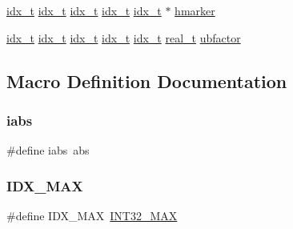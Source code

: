 \begin{DoxyCompactItemize}
\item 
\hyperlink{a00876_aaa5262be3e700770163401acb0150f52}{idx\+\_\+t} \hyperlink{a00876_aaa5262be3e700770163401acb0150f52}{idx\+\_\+t} \hyperlink{a00876_aaa5262be3e700770163401acb0150f52}{idx\+\_\+t} \hyperlink{a00876_aaa5262be3e700770163401acb0150f52}{idx\+\_\+t} \hyperlink{a00876_aaa5262be3e700770163401acb0150f52}{idx\+\_\+t} $\ast$ \hyperlink{a00876_a2d0a403870cf657adf972e808622d7c7}{hmarker}
\item 
\hyperlink{a00876_aaa5262be3e700770163401acb0150f52}{idx\+\_\+t} \hyperlink{a00876_aaa5262be3e700770163401acb0150f52}{idx\+\_\+t} \hyperlink{a00876_aaa5262be3e700770163401acb0150f52}{idx\+\_\+t} \hyperlink{a00876_aaa5262be3e700770163401acb0150f52}{idx\+\_\+t} \hyperlink{a00876_aaa5262be3e700770163401acb0150f52}{idx\+\_\+t} \hyperlink{a00876_a1924a4f6907cc3833213aba1f07fcbe9}{real\+\_\+t} \hyperlink{a00876_a32dfbc289fd431c9ca9aca2e6fb3e7b8}{ubfactor}
\end{DoxyCompactItemize}


\subsection{Macro Definition Documentation}
\mbox{\label{a00876_a4e78ddb52240687b065c7889e7ab5b99}} 
\subsubsection{\texorpdfstring{iabs}{iabs}}
{\footnotesize\ttfamily \#define iabs~abs}

\mbox{\label{a00876_a45ec4ebc9cf3a56a496d1de33fdfd7c5}} 
\subsubsection{\texorpdfstring{I\+D\+X\+\_\+\+M\+AX}{IDX\_MAX}}
{\footnotesize\ttfamily \#define I\+D\+X\+\_\+\+M\+AX~\hyperlink{a00119_a181807730d4a375f848ba139813ce04f}{I\+N\+T32\+\_\+\+M\+AX}}

